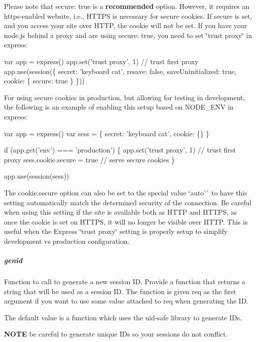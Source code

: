 Please note that {\ttfamily secure\+: true} is a {\bfseries recommended} option. However, it requires an https-\/enabled website, i.\+e., H\+T\+T\+PS is necessary for secure cookies. If {\ttfamily secure} is set, and you access your site over H\+T\+TP, the cookie will not be set. If you have your node.\+js behind a proxy and are using {\ttfamily secure\+: true}, you need to set \char`\"{}trust proxy\char`\"{} in express\+:


\begin{DoxyCode}
var app = express()
app.set('trust proxy', 1) // trust first proxy
app.use(session(\{
  secret: 'keyboard cat',
  resave: false,
  saveUninitialized: true,
  cookie: \{ secure: true \}
\}))
\end{DoxyCode}


For using secure cookies in production, but allowing for testing in development, the following is an example of enabling this setup based on {\ttfamily N\+O\+D\+E\+\_\+\+E\+NV} in express\+:


\begin{DoxyCode}
var app = express()
var sess = \{
  secret: 'keyboard cat',
  cookie: \{\}
\}

if (app.get('env') === 'production') \{
  app.set('trust proxy', 1) // trust first proxy
  sess.cookie.secure = true // serve secure cookies
\}

app.use(session(sess))
\end{DoxyCode}


The {\ttfamily cookie.\+secure} option can also be set to the special value `\textquotesingle{}auto'\`{} to have this setting automatically match the determined security of the connection. Be careful when using this setting if the site is available both as H\+T\+TP and H\+T\+T\+PS, as once the cookie is set on H\+T\+T\+PS, it will no longer be visible over H\+T\+TP. This is useful when the Express {\ttfamily \char`\"{}trust proxy\char`\"{}} setting is properly setup to simplify development vs production configuration.

\subparagraph*{genid}

Function to call to generate a new session ID. Provide a function that returns a string that will be used as a session ID. The function is given {\ttfamily req} as the first argument if you want to use some value attached to {\ttfamily req} when generating the ID.

The default value is a function which uses the {\ttfamily uid-\/safe} library to generate I\+Ds.

{\bfseries N\+O\+TE} be careful to generate unique I\+Ds so your sessions do not conflict.


